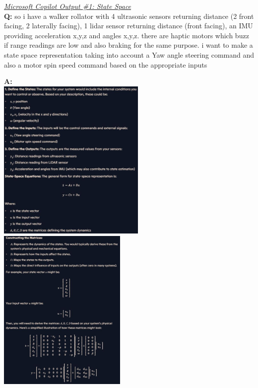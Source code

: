 \underline{\textit{Microsoft Copilot Output \#1: State Space}}\\

\noindent \textbf{Q:} so i have a walker rollator with 4 ultrasonic sensors returning distance (2 front facing, 2 laterally facing), 1 lidar sensor returning distance (front facing), an IMU providing acceleration x,y,z and angles x,y,z. there are haptic motors which buzz if range readings are low and also braking for the same purpose. i want to make a state space representation taking into account a Yaw angle steering command and also a motor spin speed command based on the appropriate inputs

\noindent \textbf{A:} \\
\includegraphics[width=0.535\textwidth]{./Images/copilot-ssr.JPG}
\includegraphics[width=0.465\textwidth]{./Images/copilot-ssr2.JPG}